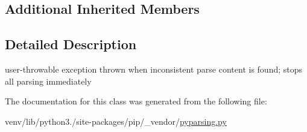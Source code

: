 \subsection*{Additional Inherited Members}


\subsection{Detailed Description}
\begin{DoxyVerb}user-throwable exception thrown when inconsistent parse content
   is found; stops all parsing immediately\end{DoxyVerb}
 

The documentation for this class was generated from the following file\+:\begin{DoxyCompactItemize}
\item 
venv/lib/python3./site-\/packages/pip/\+\_\+vendor/\hyperlink{pip_2__vendor_2pyparsing_8py}{pyparsing.\+py}\end{DoxyCompactItemize}
